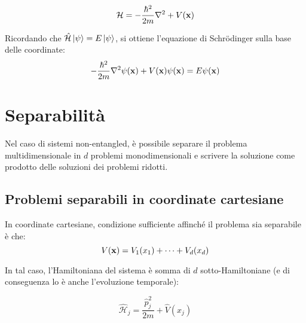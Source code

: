 \begin{equation}
	\mathcal{H} = - \frac{\hbar^2}{2m} \nabla^2 + V(\mathbf{x})
	\label{eq:7}
\end{equation}

Ricordando che $ \hat{\mathcal{H}}\ket{\psi} = E\ket{\psi} $, si ottiene l'equazione di Schrödinger sulla base delle coordinate:
\begin{equation}
	- \frac{\hbar^2}{2m} \nabla^2 \psi(\mathbf{x}) + V(\mathbf{x}) \psi(\mathbf{x}) = E \psi(\mathbf{x})
	\label{eq:8}
\end{equation}

\section{Separabilità}

Nel caso di sistemi non-entangled, è possibile separare il problema multidimensionale in $ d $ problemi monodimensionali e scrivere la soluzione come prodotto delle soluzioni dei problemi ridotti.

\subsection{Problemi separabili in coordinate cartesiane}

\begin{proposition}
	In coordinate cartesiane, condizione sufficiente affinché il problema sia separabile è che:
	\begin{equation}
		V(\mathbf{x}) = V_1(x_1) + \dots + V_d(x_d)
		\label{eq:9}
	\end{equation}
\end{proposition}

In tal caso, l'Hamiltoniana del sistema è somma di $ d $ sotto-Hamiltoniane (e di conseguenza lo è anche l'evoluzione temporale):

\begin{equation}
	\hat{\mathcal{H}}_j = \frac{\hat{p}_j^2}{2m} + \hat{V}(x_j)
	\label{eq:10}
\end{equation}










